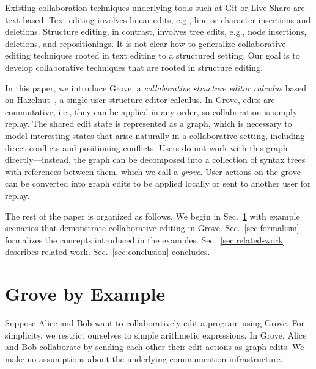 \documentclass[nonacm, acmsmall, screen, review]{acmart}
\begin{document}
Existing collaboration techniques underlying tools such at Git or Live Share are text based.
Text editing involves linear edits, e.g., line or character insertions and deletions.
Structure editing, in contrast, involves tree edits, e.g., node insertions, deletions, and repositionings.
It is not clear how to generalize collaborative editing techniques rooted in text editing to a structured setting.
Our goal is to develop collaborative techniques that are rooted in structure editing.

In this paper, we introduce Grove, a \emph{collaborative structure editor calculus} based on Hazelnut~\cite{omar_hazelnut_2017}, a single-user structure editor calculus.
In Grove, edits are commutative, i.e., they can be applied in any order, so collaboration is simply replay.
The shared edit state is represented as a graph, which is necessary to model interesting states that arise naturally in a collaborative setting, 
including direct conflicts and positioning conflicts. 
Users do not work with this graph directly---instead, the graph can be decomposed into a collection of syntax trees with references between them, which we call a \emph{grove}.
User actions on the grove can be converted into graph edits to be applied locally or sent to another user for replay.


The rest of the paper is organized as follows.
We begin in Sec.~\ref{sec:alice-and-bob} with example scenarios that demonstrate collaborative editing in Grove.
Sec.~\ref{sec:formalism} formalizes the concepts introduced in the examples.
Sec.~\ref{sec:related-work} describes related work.
Sec.~\ref{sec:conclusion} concludes.


\section{Grove by Example}
\label{sec:alice-and-bob}


Suppose Alice and Bob want to collaboratively edit a program using Grove.
For simplicity, we restrict ourselves to simple arithmetic expressions.
In Grove, Alice and Bob collaborate by sending each other their edit actions as graph edits.
We make no assumptions about the underlying communication infrastructure.
\end{document}

